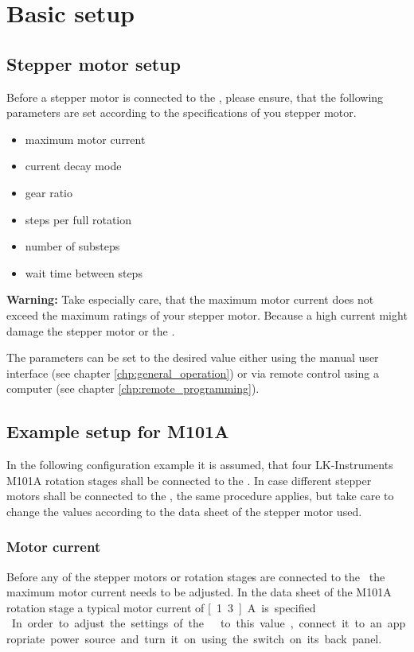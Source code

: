 \section{Basic setup}

\subsection{Stepper motor setup}
Before a stepper motor is connected to the \productName , please ensure, that the following parameters are set according to the specifications of you stepper motor.

\begin{itemize}
\item maximum motor current
\item current decay mode
\item gear ratio
\item steps per full rotation
\item number of substeps
\item wait time between steps
\end{itemize}

\textbf{Warning:} Take especially care, that the maximum motor current does not exceed the maximum ratings of your stepper motor. Because a high current might damage the stepper motor or the \productName .

The parameters can be set to the desired value either using the manual user interface (see chapter \ref{chp:general_operation}) or via remote control using a computer (see chapter \ref{chp:remote_programming}).

\subsection{Example setup for M101A}
In the following configuration example it is assumed, that four LK-Instruments M101A rotation stages shall be connected to the \productName . In case different stepper motors shall be connected to the \productName , the same procedure applies, but take care to change the values according to the data sheet of the stepper motor used.

\subsubsection{Motor current}
Before any of the stepper motors or rotation stages are connected to the \productName ~the maximum motor current needs to be adjusted. In the data sheet of the M101A rotation stage a typical motor current of \unit[1.3]{A} is specified.\\
In order to adjust the settings of the \productNumber ~\productName ~to this value, connect it to an appropriate power source and turn it on using the switch on its back panel.

